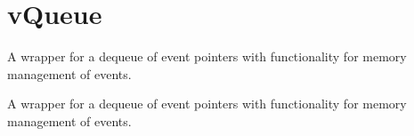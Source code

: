 \hypertarget{group__vQueue}{}\section{v\+Queue}
\label{group__vQueue}


A wrapper for a dequeue of event pointers with functionality for memory management of events.  


A wrapper for a dequeue of event pointers with functionality for memory management of events. 

